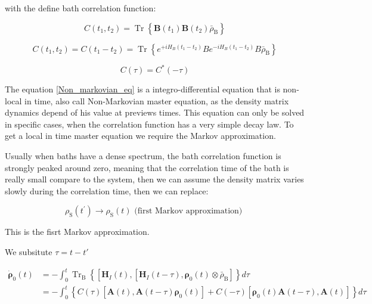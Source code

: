 \documentclass[reprint,aps,onecolumn,pra,notitlepage,nofootinbib]{revtex4-1}
\theoremstyle{definition}
\numberwithin{equation}{section}
\begin{document}
with the define bath correlation function: 

\begin{equation}C\left(t_{1}, t_{2}\right)=\operatorname{Tr}\left\{\boldsymbol{B}\left(t_{1}\right) \boldsymbol{B}\left(t_{2}\right) \bar{\rho}_{\mathrm{B}}\right\}\end{equation}




\begin{equation}C\left(t_{1}, t_{2}\right)=C\left(t_{1}-t_{2}\right)=\operatorname{Tr}\left\{e^{+i H_{B}\left(t_{1}-t_{2}\right)} B e^{-i H_{B}\left(t_{1}-t_{2}\right)} B \bar{\rho}_{\mathrm{B}}\right\}\end{equation}

\begin{equation}C(\tau)=C^{*}(-\tau)\end{equation}

The equation \ref{Non_markovian_eq} is a integro-differential equation that is non-local in time, also call Non-Markovian master equation, as the density matrix dynamics depend of  his value at previews times. This equation can only be solved in specific cases, when the correlation function has a very simple decay law. To get a local in time master equation we require  the Markov approximation.

Usually when baths have a dense spectrum, the bath correlation function is strongly peaked around zero, meaning that the correlation time of the bath is really small compare to the system, then we can assume the density matrix varies slowly during the correlation time, then  we can replace: 


\begin{equation}\rho_{\mathrm{S}}\left(t^{\prime}\right) \rightarrow \rho_{\mathrm{S}}(t) \text { (first Markov approximation) }\end{equation}

This is the fisrt Markov approximation.  

We subsitute $\tau=t-t'$


\begin{equation}\begin{aligned}
\dot{\boldsymbol{\rho}}_0(t) &=-\int_{0}^{t} \operatorname{Tr}_{\mathrm{B}}\left\{\left[\boldsymbol{H}_{I}(t),\left[\boldsymbol{H}_{I}(t-\tau), \boldsymbol{\rho}_{\mathrm{0}}(t) \otimes \bar{\rho}_{\mathrm{B}}\right]\right\} d \tau\right.\\
&=- \int_{0}^{t}\left\{C(\tau)\left[\boldsymbol{A}(t), \boldsymbol{A}(t-\tau) \boldsymbol{\rho}_{\mathrm{0}}(t)\right]+C(-\tau)\left[\boldsymbol{\rho}_{\mathrm{0}}(t) \boldsymbol{A}(t-\tau), \boldsymbol{A}(t)\right]\right\} d \tau
\end{aligned}\end{equation}
\end{document}
